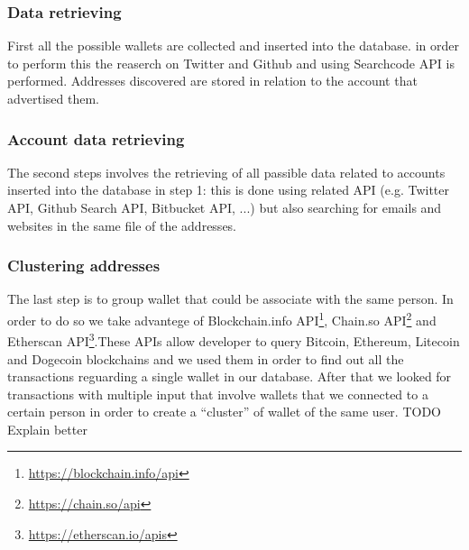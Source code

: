 \subsubsection*{Data retrieving} First all the possible wallets are collected
and inserted into the database. in order to perform this the reaserch on
Twitter and Github and using Searchcode API is performed. Addresses discovered
are stored in relation to the account that advertised them.
\subsubsection*{Account data retrieving} The second steps involves the
retrieving of all passible data related to accounts inserted into the database
in step 1: this is done using related API (e.g. Twitter API, Github Search API,
Bitbucket API, ...) but also searching for emails and websites in the same file
of the addresses.
\subsubsection*{Clustering addresses} The last step is to group wallet that
could be associate with the same person. In order to do so we take advantege of
Blockchain.info API\footnote{\url{https://blockchain.info/api}},
Chain.so API\footnote{\url{https://chain.so/api}} and
Etherscan API\footnote{\url{https://etherscan.io/apis}}.These APIs allow
developer to query Bitcoin, Ethereum, Litecoin and Dogecoin blockchains and we
used them in order to find out all the transactions reguarding a single wallet
in our database. After that we looked for transactions with multiple input that
involve wallets that we connected to a certain person in order to create a
``cluster'' of wallet of the same user. TODO Explain better












